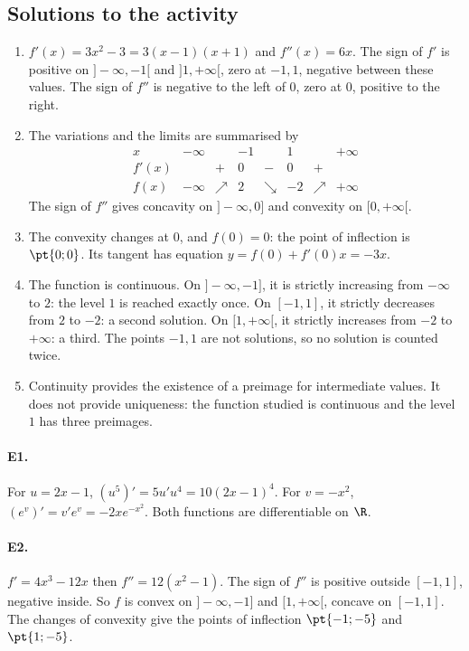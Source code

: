 \subsection{Solutions to the activity}\begin{enumerate}
\item $f'(x)=3x^2-3=3(x-1)(x+1)$ and $f''(x)=6x$. The sign of $f'$ is positive on $]-\infty,-1[$ and $]1,+\infty[$, zero at $-1,1$, negative between these values. The sign of $f''$ is negative to the left of $0$, zero at $0$, positive to the right.
\item The variations and the limits are summarised by
\[\begin{array}{c|ccccccc}x&-\infty&&-1&&1&&+\infty\\\hline f'(x)&&+&0&-&0&+&\\\hline f(x)&-\infty&\nearrow&2&\searrow&-2&\nearrow&+\infty\end{array}\]
The sign of $f''$ gives concavity on $]-\infty,0]$ and convexity on $[0,+\infty[$.
\item The convexity changes at $0$, and $f(0)=0$: the point of inflection is $\pt{0;0}$. Its tangent has equation $y=f(0)+f'(0)x=-3x$.
\item The function is continuous. On $]-\infty,-1]$, it is strictly increasing from $-\infty$ to $2$: the level $1$ is reached exactly once. On $[-1,1]$, it strictly decreases from $2$ to $-2$: a second solution. On $[1,+\infty[$, it strictly increases from $-2$ to $+\infty$: a third. The points $-1,1$ are not solutions, so no solution is counted twice.
\item Continuity provides the existence of a preimage for intermediate values. It does not provide uniqueness: the function studied is continuous and the level $1$ has three preimages.
\end{enumerate}

\paragraph{E1.}For $u=2x-1$, $(u^5)'=5u' u^4=10(2x-1)^4$. For $v=-x^2$, $(e^v)'=v' e^v=-2xe^{-x^2}$. Both functions are differentiable on $\R$.

\paragraph{E2.}$f'=4x^3-12x$ then $f''=12(x^2-1)$. The sign of $f''$ is positive outside $[-1,1]$, negative inside. So $f$ is convex on $]-\infty,-1]$ and $[1,+\infty[$, concave on $[-1,1]$. The changes of convexity give the points of inflection $\pt{-1;-5}$ and $\pt{1;-5}$.

